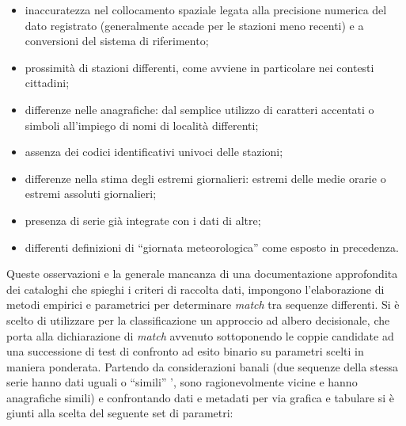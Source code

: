 \begin{itemize}
  \item
    inaccuratezza nel collocamento spaziale legata alla precisione numerica del dato registrato (generalmente accade per le stazioni meno recenti) e a conversioni del sistema di riferimento;
  \item
    prossimità di stazioni differenti, come avviene in particolare nei contesti cittadini;
  \item
    differenze nelle anagrafiche: dal semplice utilizzo di caratteri accentati o simboli all'impiego di nomi di località differenti;
  \item
    assenza dei codici identificativi univoci delle stazioni;
  \item
    differenze nella stima degli estremi giornalieri: estremi delle medie orarie o estremi assoluti giornalieri;
  \item
    presenza di serie già integrate con i dati di altre;
  \item
    differenti definizioni di ``giornata meteorologica'' come esposto in precedenza.
\end{itemize}

Queste osservazioni e la generale mancanza di una documentazione approfondita dei cataloghi che spieghi i criteri di raccolta dati, impongono l'elaborazione di metodi empirici e parametrici per determinare \emph{match} tra sequenze differenti. Si è scelto di utilizzare per la classificazione un approccio ad albero decisionale, che porta alla dichiarazione di \emph{match} avvenuto sottoponendo le coppie candidate ad una successione di test di confronto ad esito binario su parametri scelti in maniera ponderata. Partendo da considerazioni banali (due sequenze della stessa serie hanno dati uguali o ``simili'' ', sono ragionevolmente vicine e hanno anagrafiche simili) e confrontando dati e metadati per via grafica e tabulare si è giunti alla scelta del seguente set di parametri:

